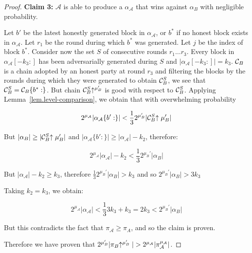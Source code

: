 \begin{proof}
    \textbf{Claim 3: } $\mathcal{A}$ is able to produce a $\alpha_\mathcal{A}$
    that wins against $\alpha_B$ with negligible probability.

    Let $b'$ be the latest honestly generated block in $\alpha_\mathcal{A}$, or
    $b^*$ if no honest block exists in $\alpha_\mathcal{A}$. Let $r_1$ be the
    round during which $b^*$ was generated. Let $j$ be the index of block $b^*$.
    Consider now the set $S$ of consecutive rounds $r_1 \ldots r_3$. Every block
    in $\alpha_\mathcal{A}[-k_3:]$ has been adversarially generated during $S$
    and $|\alpha_\mathcal{A}[-k_3:]| = k_3$. $\mathcal{C}_B$ is a chain adopted by an
    honest party at round $r_3$ and filtering the blocks by the rounds during
    which they were generated to obtain $\mathcal{C}_B^S$, we see that $\mathcal{C}_B^S =
    \mathcal{C}_B\{b^*:\}$. But chain $\mathcal{C}_B^S\negthickspace\uparrow^{\mu_B'}$ is good with
    respect to $\mathcal{C}_B^S$. Applying Lemma~\ref{lem.level-comparison}, we
    obtain that with overwhelming probability

    \begin{equation*}
    2^{\mu_\mathcal{A}}|\alpha_\mathcal{A}\{b':\}| <
    \frac{1}{3}2^{\mu_B'}|\mathcal{C}_B^S\negthickspace\uparrow{\mu_B'}|
    \end{equation*}

    But $|\alpha_B| \geq |\mathcal{C}_B^S\negthickspace\uparrow{\mu_B'}|$ and
    $|\alpha_\mathcal{A}\{b':\}| \geq |\alpha_\mathcal{A}| - k_2$, therefore:

    \begin{equation*}
    2^{\mu_\mathcal{A}}|\alpha_\mathcal{A}| - k_2 <
    \frac{1}{3}2^{\mu_B'}|\alpha_B|
    \end{equation*}

    But $|\alpha_\mathcal{A}| - k_2 \geq k_3$, therefore
    $\frac{1}{3}2^{\mu_B'}|\alpha_B| > k_3$ and so $2^{\mu_B'}|\alpha_B| > 3k_3$

    Taking $k_2 = k_3$, we obtain:

    \begin{equation*}
    2^{\mu_\mathcal{A}}|\alpha_\mathcal{A}| <
    \frac{1}{3}3k_3 + k_3 = 2k_3 < 2^{\mu_B'}|\alpha_B|
    \end{equation*}

    But this contradicts the fact that
    $\pi_\mathcal{A} \geq \pi_A$, and so the claim is proven.

    Therefore we have proven that $2^{\mu_B'}|\pi_B\negthickspace\uparrow^{\mu_B'}| >
    2^{\mu_\mathcal{A}}|\pi_\mathcal{A}^{\mu_\mathcal{A}}|$.


\end{proof}
